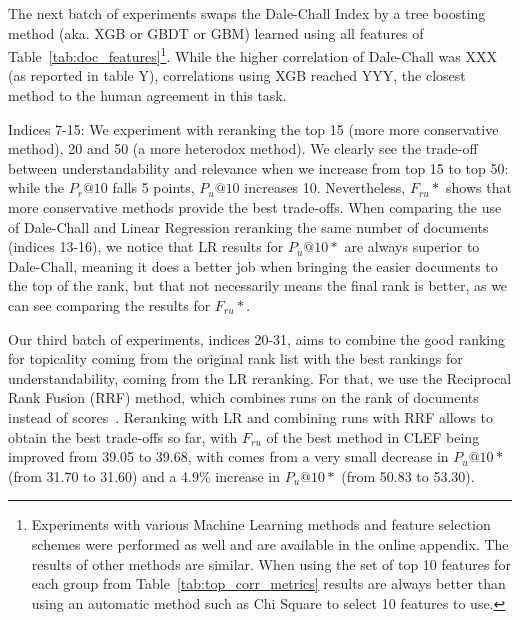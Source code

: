 The next batch of experiments swaps the Dale-Chall Index by a tree boosting method (aka. XGB or GBDT or GBM) learned using all features of Table~\ref{tab:doc_features}\footnote{Experiments with various Machine Learning methods and feature selection schemes were performed as well and are available in the online appendix. The results of other methods are similar. When using the set of top 10 features for each group from Table~\ref{tab:top_corr_metrics} results are always better than using an automatic method such as Chi Square to select 10 features to use.}.
While the higher correlation of Dale-Chall was XXX (as reported in table Y), correlations using XGB reached YYY, the closest method to the human agreement in this task.

Indices 7-15:
We experiment with reranking the top 15 (more more conservative method), 20 and 50 (a more heterodox method). We clearly see the trade-off between understandability and relevance when we increase from top 15 to top 50: while the $P_r@10$ falls 5 points, $P_u@10$ increases 10. Nevertheless, $F_{ru}*$ shows that more conservative methods provide the best trade-offs.
When comparing the use of Dale-Chall and Linear Regression reranking the same number of documents (indices 13-16), we notice that LR results for $P_u@10*$ are always superior to Dale-Chall, meaning it does a better job when bringing the easier documents to the top of the rank, but that not necessarily means the final rank is better, as we can see comparing the results for $F_{ru}*$.

Our third batch of experiments, indices 20-31, aims to combine the good ranking for topicality coming from the original rank list with the best rankings for understandability, coming from the LR reranking.
For that, we use the Reciprocal Rank Fusion (RRF) method, which combines runs on the rank of documents instead of scores~\cite{cormack09}. Reranking with LR and combining runs with RRF allows to obtain the best trade-offs so far, with $F_{ru}$ of the best method in CLEF being improved from 39.05 to 39.68, with comes from a very small decrease in $P_u@10*$ (from 31.70 to 31.60) and a 4.9\% increase in $P_u@10*$ (from 50.83 to 53.30).

